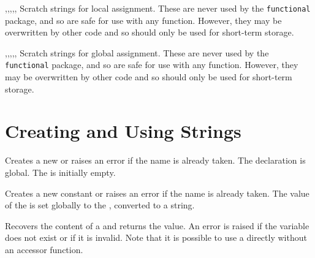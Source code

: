 \documentclass[oneside]{book}
\begin{document}
\begin{variable}{\lTmpaStr,\lTmpbStr,\lTmpcStr,\lTmpiStr,\lTmpjStr,\lTmpkStr}
Scratch strings for local assignment. These are never used by
the \verb!functional! package, and so are safe for use with any
function. However, they may be overwritten by other
code and so should only be used for short-term storage.
\end{variable}

\begin{variable}{\gTmpaStr,\gTmpbStr,\gTmpcStr,\gTmpiStr,\gTmpjStr,\gTmpkStr}
Scratch strings for global assignment. These are never used by
the \verb!functional! package, and so are safe for use with any
function. However, they may be overwritten by other
code and so should only be used for short-term storage.
\end{variable}

\section{Creating and Using Strings}

\begin{function}{\strNew}
\begin{syntax}
 
\end{syntax}
Creates a new  or raises an error if the name is
already taken. The declaration is global. The  is
initially empty.
\begin{codehigh}
\strNew \lFooSomeStr
\end{codehigh}
\end{function}

\begin{function}{\strConst}
\begin{syntax}
  
\end{syntax}
Creates a new constant  or raises an error if the name
is already taken.  The value of the  is set
globally to the , converted to a string.
\begin{codehigh}
\strConst {}
\end{codehigh}
\end{function}

\begin{function}{\strUse}
\begin{syntax}
 
\end{syntax}
Recovers the content of a  and returns the value.
An error is raised if the variable
does not exist or if it is invalid. Note that it is possible to use
a  directly without an accessor function.
\begin{codehigh}
\strUse \lTmpaStr
\end{codehigh}
\end{function}
\end{document}
